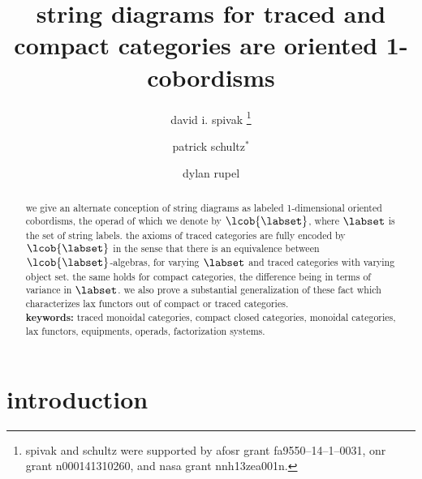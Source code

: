 \documentclass[11pt,oneside,article]{memoir}
\title{string diagrams for traced and compact categories are oriented 1-cobordisms}
\author{
   david i. spivak%
      \thanks{spivak and schultz were supported by afosr grant fa9550--14--1--0031, onr grant n000141310260, and nasa grant nnh13zea001n.}
   \and patrick schultz${}^*$%
   \and dylan rupel
}
\date{\vspace{-3ex}}
\begin{document}
\tightlists
\firmlists

\maketitle
\begin{abstract}
   we give an alternate conception of string diagrams as labeled 1-dimensional oriented cobordisms,
   the operad of which we denote by $\lcob{\labset}$, where $\labset$ is the set of string labels.
   the axioms of traced categories are fully encoded by $\lcob{\labset}$ in the sense that there is
   an equivalence between $\lcob{\labset}$-algebras, for varying $\labset$ and traced categories
   with varying object set. the same holds for compact categories, the difference being in terms of
   variance in $\labset$. we also prove a substantial generalization of these fact which
   characterizes lax functors out of compact or traced categories. \\

   \noindent\textbf{keywords:} traced monoidal categories, compact closed categories, monoidal categories, lax functors, equipments, operads, factorization systems.
\end{abstract}


\chapter{introduction}\label{chap:intro}
\end{document}
